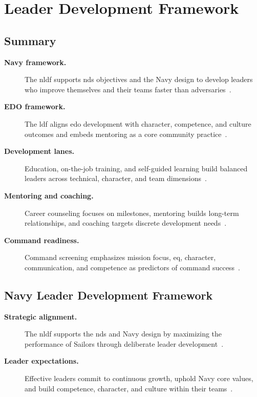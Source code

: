 \documentclass[../main.tex]{subfiles}
\begin{document}
\section{Leader Development Framework}
\label{sec:leader-development-framework}

\subsection{Summary}
\begin{description}
  \item[\textbf{Navy framework.}] The \ac{nldf} supports \ac{nds} objectives and the Navy design to develop
  leaders who improve themselves and their teams faster than adversaries~\autocite{edo-5-2-10-leader-development-framework-2025,Navy-NLDF-GRGB-Leaders-Toolkit-2026}.
  \item[\textbf{EDO framework.}] The \ac{ldf} aligns \ac{edo} development with character, competence, and
  culture outcomes and embeds mentoring as a core community practice~\autocite{edo-5-2-10-leader-development-framework-2025}.
  \item[\textbf{Development lanes.}] Education, on-the-job training, and self-guided learning build balanced
  leaders across technical, character, and team dimensions~\autocite{edo-5-2-10-leader-development-framework-2025}.
  \item[\textbf{Mentoring and coaching.}] Career counseling focuses on milestones, mentoring builds
  long-term relationships, and coaching targets discrete development needs~\autocite{edo-5-2-10-leader-development-framework-2025}.
  \item[\textbf{Command readiness.}] Command screening emphasizes mission focus, \ac{eq}, character,
  communication, and competence as predictors of command success~\autocite{edo-5-2-10-leader-development-framework-2025}.
\end{description}

\subsection{Navy Leader Development Framework}
\begin{description}
  \item[\textbf{Strategic alignment.}] The \ac{nldf} supports the \ac{nds} and Navy design by maximizing the
  performance of Sailors through deliberate leader development~\autocite{edo-5-2-10-leader-development-framework-2025,Navy-NLDF-GRGB-Leaders-Toolkit-2026}.
  \item[\textbf{Leader expectations.}] Effective leaders commit to continuous growth, uphold Navy core
  values, and build competence, character, and culture within their teams~\autocite{edo-5-2-10-leader-development-framework-2025,Navy-NLDF-GRGB-Leaders-Toolkit-2026}.
\end{description}
\end{document}
